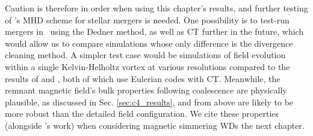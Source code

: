 Caution is therefore in order when using this chapter's results, and further testing of \arepo's MHD scheme for stellar mergers is needed.  One possibility is to test-run mergers in \arepo\ using the Dedner method, as well as CT further in the future, which would allow us to compare simulations whose only difference is the divergence cleaning method.  A simpler test case would be simulations of field evolution within a single Kelvin-Helholtz vortex at various resolutions compared to the results of \cite{oberam10} and \cite{zrakm13}, both of which use Eulerian codes with CT.  Meanwhile, the remnant magnetic field's bulk properties following coalescence are physically plausible, as discussed in Sec. \ref{sec:c4_results}, and from above are likely to be more robust than the detailed field configuration.  We cite these properties (alongside \cite{ji+13}'s work) when considering magnetic simmering WDs the next chapter.



